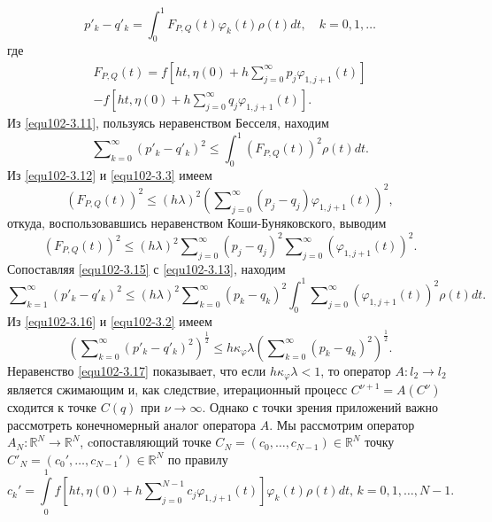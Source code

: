 \begin{equation}\label{equ102-3.11}
p'_k-q'_k=\int_{0}^1F_{P,Q}(t)\varphi_k(t)\rho(t)dt,\quad k=0,1,\ldots
\end{equation}
где
\begin{multline}\label{equ102-3.12}
 F_{P,Q}(t)=f\left[ht,\eta(0)+ h\sum\nolimits_{j=0}^\infty p_j\varphi_{1,j+1}(t)\right] \\
  -f\left[ht,\eta(0)+ h\sum\nolimits_{j=0}^\infty q_j\varphi_{1,j+1}(t)\right].
\end{multline}
Из \eqref{equ102-3.11}, пользуясь неравенством Бесселя, находим
 \begin{equation}\label{equ102-3.13}
\sum\nolimits_{k=0}^\infty (p'_k-q'_k)^2\le\int_{0}^1(F_{P,Q}(t))^2\rho(t) dt.
\end{equation}
Из \eqref{equ102-3.12} и \eqref{equ102-3.3}  имеем
 \begin{equation}\label{equ102-3.15}
(F_{P,Q}(t))^2\le (h\lambda)^2   \left(\sum\nolimits_{j=0}^\infty( p_j-q_j)\varphi_{1,j+1}(t)\right)^2,
\end{equation}
откуда,  воспользовавшись неравенством Коши-Буняковского, выводим
$$
(F_{P,Q}(t))^2\le(h\lambda)^2   \sum\nolimits_{j=0}^\infty( p_j-q_j)^2\sum\nolimits_{j=0}^\infty(\varphi_{1,j+1}(t))^2.
$$
Сопоставляя \eqref{equ102-3.15} с \eqref{equ102-3.13}, находим
\begin{equation}\label{equ102-3.16}
\sum\nolimits_{k=1}^\infty (p'_k-q'_k)^2\le(h\lambda)^2 \sum\nolimits_{k=0}^\infty( p_k-q_k)^2\int_{0}^1 \sum\nolimits_{j=0}^\infty(\varphi_{1,j+1}(t))^2\rho(t) dt.
\end{equation}
Из  \eqref{equ102-3.16}  и \eqref{equ102-3.2} имеем
\begin{equation}\label{equ102-3.17}
\left(\sum\nolimits_{k=0}^\infty (p'_k-q'_k)^2\right)^\frac12\le h\kappa_\varphi\lambda \left(\sum\nolimits_{k=0}^\infty (p_k-q_k)^2\right)^\frac12. \end{equation}
Неравенство \eqref{equ102-3.17} показывает, что если $h\kappa_\varphi\lambda<1$, то оператор  $A:l_2\to l_2$ является сжимающим и, как следствие, итерационный процесс $C^{\nu+1}=A(C^{\nu})$  сходится к точке $C(q)$ при $\nu\to\infty$. Однако с точки зрения приложений важно рассмотреть конечномерный аналог оператора $A$. Мы рассмотрим оператор $A_N:\mathbb{R}^N\to \mathbb{R}^N$, cопоставляющий точке
$C_N=(c_0,\ldots,c_{N-1})\in \mathbb{R}^N $ точку  $C'_N=(c_0',\ldots,c_{N-1}')\in \mathbb{R}^N $ по правилу
\begin{equation}\label{equ102-3.18}
c_k'=\int\limits_{0}^1f\left[ht,\eta(0)+ h\sum\nolimits_{j=0}^{N-1} c_j\varphi_{1,j+1}(t)\right]\varphi_k(t)\rho(t) dt,\,k=0,1,\ldots, N-1.
\end{equation}
